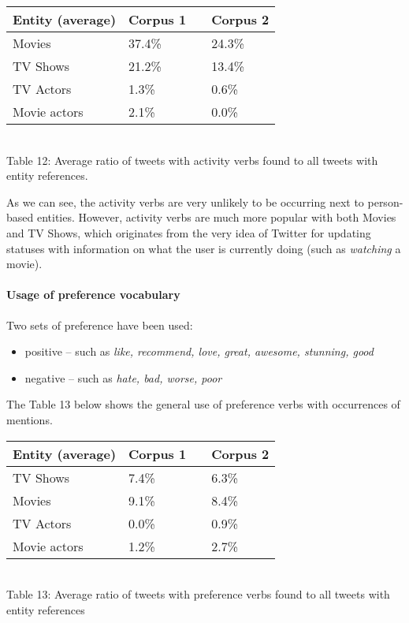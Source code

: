 \begin{center}
  \begin{tabular}{ | p{4cm} | p{2cm} | p{1cm}| p{2cm} | } \hline
    Entity (average) & Corpus 1 & & Corpus 2 \\ \hline
    Movies & 37.4\% & & 24.3\% \\ \hline
    TV Shows & 21.2\% & & 13.4\% \\ \hline
    TV Actors & 1.3\% & & 0.6\% \\ \hline
    Movie actors & 2.1\% & & 0.0\% \\ \hline
  \end{tabular} \\
  Table 12: Average ratio of tweets with activity verbs found to all tweets with entity references. \\
\end{center}

As we can see, the activity verbs are very unlikely to be occurring next to
person-based entities. However, activity verbs are much more popular with both
Movies and TV Shows, which originates from the very idea of Twitter for
updating statuses with information on what the user is currently doing (such as \textit{watching}
a movie).

\paragraph{Usage of preference vocabulary}
Two sets of preference have been used:
\begin{itemize}
  \item positive -- such as \textit{like, recommend, love, great, awesome, stunning, good}
  \item negative -- such as \textit{hate, bad, worse, poor}
\end{itemize}

The Table 13 below shows the general use of preference verbs with occurrences of
mentions.

\begin{center}
  \begin{tabular}{ | p{4cm} | p{2cm} | p{1cm}| p{2cm} | } \hline
    Entity (average) & Corpus 1 & & Corpus 2 \\ \hline
    TV Shows & 7.4\% & & 6.3\% \\ \hline
    Movies & 9.1\% & & 8.4\% \\ \hline
    TV Actors & 0.0\% & & 0.9\% \\ \hline
    Movie actors & 1.2\% & & 2.7\% \\ \hline
  \end{tabular} \\
  Table 13: Average ratio of tweets with preference verbs found to all tweets with entity references \\
\end{center}

